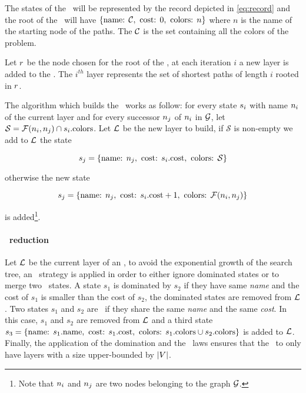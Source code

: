 The states of the \mdd\ will be represented by the record depicted in \cref{eq:record} and the root of the \mdd\ will have $\{\text{name: } \mathcal{C}, \text{ cost: } 0, \text{ colors: } n \}$ where $n$ is the name of the starting node of the paths. The $\mathcal{C}$ is the set containing all the colors of the problem.

Let $r$ be the node chosen for the root of the \mdd, at each iteration $i$ a new layer is added to the \mdd. The $i^{th}$ layer represents the set of shortest paths of length $i$ rooted in $r$.

The algorithm which builds the \mdd\ works as follow: for every state $s_i$ with name $n_i$ of the current layer and for every successor $n_j$ of $n_i$ in $\mathcal{G}$, let $\mathcal{S} = \mathcal{F}(n_i, n_j) \cap s_i\text{.colors}$. Let $\mathcal{L}$ be the new layer to build, if $\mathcal{S}$ is non-empty we add to $\mathcal{L}$ the state

$$s_j = \{\text{name: } n_j, \text{ cost: } s_i\text{.cost}, \text{ colors: } \mathcal{S} \}$$

otherwise the new state

$$s_j = \{\text{name: } n_j, \text{ cost: } s_i\text{.cost} + 1, \text{ colors: } \mathcal{F}(n_i, n_j) \}$$

is added\footnote{Note that $n_i$ and $n_j$ are two nodes belonging to the graph $\mathcal{G}$.}.

\paragraph{\mdd\ reduction} Let $\mathcal{L}$ be the current layer of an \mdd, to avoid the exponential growth of the search tree, an \adhoc\ strategy is applied in order to either ignore dominated states or to merge two \compatibleState\ states. A state $s_1$ is dominated by $s_2$ if they have same \textit{name} and the cost of $s_1$ is smaller than the cost of $s_2$, the dominated states are removed from $\mathcal{L}$. Two states $s_1$ and $s_2$ are \compatibleState\ if they share the same \textit{name} and the same \textit{cost}. In this case, $s_1$ and $s_2$ are removed from $\mathcal{L}$ and a third state $s_3 = \{\text{name: } s_1\text{.name}, \text{ cost: } s_1.\text{cost}, \text{ colors: } s_1\text{.colors} \cup s_2\text{.colors} \}$ is added to $\mathcal{L}$.\\
Finally, the application of the domination and the \compatibleState\ laws ensures that the \mdd\ to only have layers with a size upper-bounded by $|V|$.

